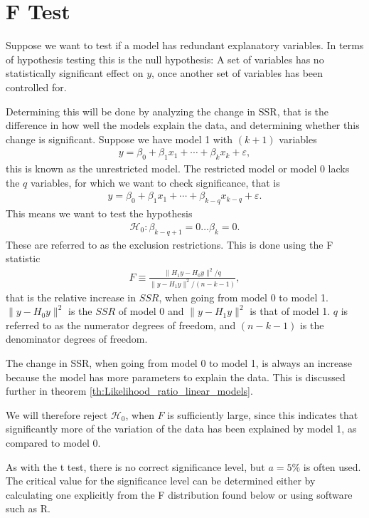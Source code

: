 \section{F Test}

Suppose we want to test if a model has redundant explanatory variables.
In terms of hypothesis testing this is the null hypothesis: A set of variables has no statistically significant effect on $y$, once another set of variables has been controlled for. 

Determining this will be done by analyzing the change in SSR, that is the difference in how well the models explain the data, and determining whether this change is significant. 
Suppose we have model 1 with $(k+1)$ variables 
\begin{align*}
    y = \beta_0 + \beta_1 x_1 + \cdots + \beta_k x_k + \varepsilon,
\end{align*}
this is known as the unrestricted model. The restricted model or model 0 lacks the $q$ variables, for which we want to check significance, that is
\begin{align*}
    y = \beta_0 + \beta_1 x_1 + \cdots + \beta_{k-q} x_{k-q} + \varepsilon.
\end{align*}
This means we want to test the hypothesis
\begin{align}
    \mathcal{H}_0: \beta_{k-q+1} = 0 \ldots \beta_k = 0.
\end{align}
These are referred to as the exclusion restrictions. 
This is done using the F statistic
\begin{align}\label{eq:F_statistic}
    F \equiv \frac{\| H_1 y - H_0 y \|^2/q}{\| y - H_1 y \|^2/(n-k-1)},
\end{align}
that is the relative increase in $SSR$, when going from model 0 to model 1. 
$\| y - H_0 y \|^2$ is the $SSR$ of model 0 and $\| y - H_1 y \|^2$ is that of model 1. 
$q$ is referred to as the numerator degrees of freedom, and $(n-k-1)$ is the denominator degrees of freedom. 

The change in SSR, when going from model 0 to model 1, is always an increase because the model has more parameters to explain the data. 
This is discussed further in theorem \ref{th:Likelihood_ratio_linear_models}.

We will therefore reject $\mathcal{H}_0$, when $F$ is sufficiently large, since this indicates that significantly more of the variation of the data has been explained by model 1, as compared to model 0.

As with the t test, there is no correct significance level, but $a = 5 \%$ is often used. 
The critical value for the significance level can be determined either by calculating one explicitly from the F distribution found below or using software such as R. 

